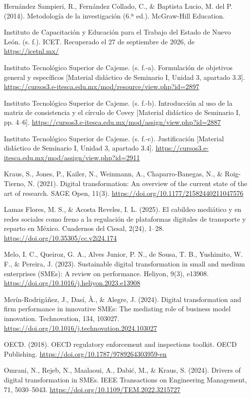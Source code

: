 {Hernández Sampieri, R., Fernández Collado, C., \& Baptista Lucio, M. del P. (2014). Metodología de la investigación (6.ª ed.). McGraw-Hill Education.


Instituto de Capacitación y Educación para el Trabajo del Estado de Nuevo León. (s. f.). ICET. Recuperado el 27 de septiembre de 2026, de \url{https://icetnl.mx/}


Instituto Tecnológico Superior de Cajeme. (s. f.-a). Formulación de objetivos general y específicos [Material didáctico de Seminario I, Unidad 3, apartado 3.3]. \url{https://cursos3.e-itesca.edu.mx/mod/resource/view.php?id=2897}


Instituto Tecnológico Superior de Cajeme. (s. f.-b). Introducción al uso de la matriz de consistencia y el círculo de Covey [Material didáctico de Seminario I, pp. 4–6]. \url{https://cursos3.e-itesca.edu.mx/mod/assign/view.php?id=2887}


Instituto Tecnológico Superior de Cajeme. (s. f.-c). Justificación [Material didáctico de Seminario I, Unidad 3, apartado 3.4]. \url{https://cursos3.e-itesca.edu.mx/mod/assign/view.php?id=2911}


Kraus, S., Jones, P., Kailer, N., Weinmann, A., Chaparro-Banegas, N., \& Roig-Tierno, N. (2021). Digital transformation: An overview of the current state of the art of research. SAGE Open, 11(3). \url{https://doi.org/10.1177/21582440211047576}


Lamas Flores, M. S., \& Acosta Reveles, I. L. (2025). El cabildeo mediático y en redes sociales como freno a la regulación de plataformas digitales de transporte y reparto en México. Cuadernos del Ciesal, 2(24), 1–28. \url{https://doi.org/10.35305/cc.v2i24.174}


Melo, I. C., Queiroz, G. A., Alves Junior, P. N., de Sousa, T. B., Yushimito, W. F., \& Pereira, J. (2023). Sustainable digital transformation in small and medium enterprises (SMEs): A review on performance. Heliyon, 9(3), e13908. \url{https://doi.org/10.1016/j.heliyon.2023.e13908}


Merín-Rodrigáñez, J., Dasí, À., \& Alegre, J. (2024). Digital transformation and firm performance in innovative SMEs: The mediating role of business model innovation. Technovation, 134, 103027. \url{https://doi.org/10.1016/j.technovation.2024.103027}


OECD. (2018). OECD regulatory enforcement and inspections toolkit. OECD Publishing. \url{https://doi.org/10.1787/9789264303959-en}


Omrani, N., Rejeb, N., Maalaoui, A., Dabić, M., \& Kraus, S. (2024). Drivers of digital transformation in SMEs. IEEE Transactions on Engineering Management, 71, 5030–5043. \url{https://doi.org/10.1109/TEM.2022.3215727}


}
